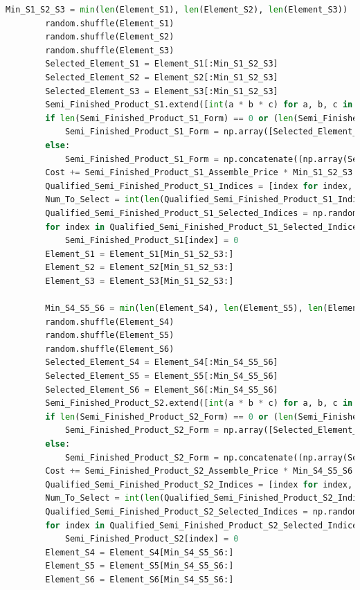 \documentclass[withoutpreface,bwprint]{cumcmthesis} %
\begin{document}
\begin{appendices}
\begin{lstlisting}[language=python]
		Min_S1_S2_S3 = min(len(Element_S1), len(Element_S2), len(Element_S3))
		random.shuffle(Element_S1)
		random.shuffle(Element_S2)
		random.shuffle(Element_S3)
		Selected_Element_S1 = Element_S1[:Min_S1_S2_S3]
		Selected_Element_S2 = Element_S2[:Min_S1_S2_S3]
		Selected_Element_S3 = Element_S3[:Min_S1_S2_S3]
		Semi_Finished_Product_S1.extend([int(a * b * c) for a, b, c in zip(Selected_Element_S1, Selected_Element_S2, Selected_Element_S3)])
		if len(Semi_Finished_Product_S1_Form) == 0 or (len(Semi_Finished_Product_S1_Form) == 3 and all(len(sublist) == 0 for sublist in Semi_Finished_Product_S1_Form)):
			Semi_Finished_Product_S1_Form = np.array([Selected_Element_S1, Selected_Element_S2, Selected_Element_S3])
		else:
			Semi_Finished_Product_S1_Form = np.concatenate((np.array(Semi_Finished_Product_S1_Form), np.array([Selected_Element_S1, Selected_Element_S2, Selected_Element_S3])), axis=1)
		Cost += Semi_Finished_Product_S1_Assemble_Price * Min_S1_S2_S3
		Qualified_Semi_Finished_Product_S1_Indices = [index for index, value in enumerate(Semi_Finished_Product_S1) if value == 1]
		Num_To_Select = int(len(Qualified_Semi_Finished_Product_S1_Indices) * Perturbed_Semi_Finished_Product_S1_Defect_Rate)
		Qualified_Semi_Finished_Product_S1_Selected_Indices = np.random.choice(Qualified_Semi_Finished_Product_S1_Indices, size=Num_To_Select, replace=False)
		for index in Qualified_Semi_Finished_Product_S1_Selected_Indices:
			Semi_Finished_Product_S1[index] = 0
		Element_S1 = Element_S1[Min_S1_S2_S3:]
		Element_S2 = Element_S2[Min_S1_S2_S3:]
		Element_S3 = Element_S3[Min_S1_S2_S3:]
	
		Min_S4_S5_S6 = min(len(Element_S4), len(Element_S5), len(Element_S6))
		random.shuffle(Element_S4)
		random.shuffle(Element_S5)
		random.shuffle(Element_S6)
		Selected_Element_S4 = Element_S4[:Min_S4_S5_S6]
		Selected_Element_S5 = Element_S5[:Min_S4_S5_S6]
		Selected_Element_S6 = Element_S6[:Min_S4_S5_S6]
		Semi_Finished_Product_S2.extend([int(a * b * c) for a, b, c in zip(Selected_Element_S4, Selected_Element_S5, Selected_Element_S6)])
		if len(Semi_Finished_Product_S2_Form) == 0 or (len(Semi_Finished_Product_S2_Form) == 3 and all(len(sublist) == 0 for sublist in Semi_Finished_Product_S2_Form)):
			Semi_Finished_Product_S2_Form = np.array([Selected_Element_S4, Selected_Element_S5, Selected_Element_S6])
		else:
			Semi_Finished_Product_S2_Form = np.concatenate((np.array(Semi_Finished_Product_S2_Form), np.array([Selected_Element_S4, Selected_Element_S5, Selected_Element_S6])), axis=1)
		Cost += Semi_Finished_Product_S2_Assemble_Price * Min_S4_S5_S6
		Qualified_Semi_Finished_Product_S2_Indices = [index for index, value in enumerate(Semi_Finished_Product_S2) if value == 1]
		Num_To_Select = int(len(Qualified_Semi_Finished_Product_S2_Indices) * Perturbed_Semi_Finished_Product_S2_Defect_Rate)
		Qualified_Semi_Finished_Product_S2_Selected_Indices = np.random.choice(Qualified_Semi_Finished_Product_S2_Indices, size=Num_To_Select, replace=False)
		for index in Qualified_Semi_Finished_Product_S2_Selected_Indices:
			Semi_Finished_Product_S2[index] = 0
		Element_S4 = Element_S4[Min_S4_S5_S6:]
		Element_S5 = Element_S5[Min_S4_S5_S6:]
		Element_S6 = Element_S6[Min_S4_S5_S6:]
	

\end{lstlisting}
\end{appendices}
\end{document}

